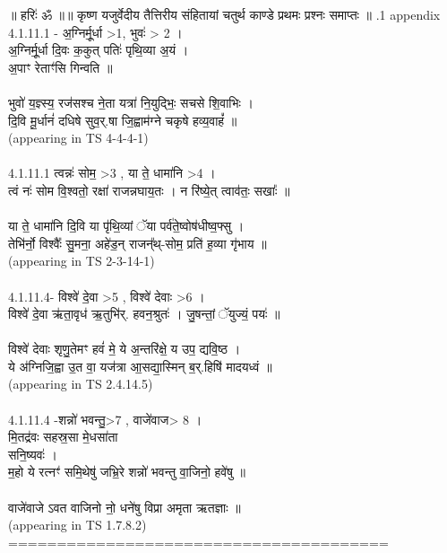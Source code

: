 \documentclass[17pt]{extarticle}
\begin{document}
        
        ॥ हरिः॑ ॐ ॥॥ कृष्ण यजुर्वेदीय तैत्तिरीय संहितायां चतुर्थ काण्डे प्रथमः प्रश्नः समाप्तः ॥ \newline
        .1   appendix\\4.1.11.1 - अ॒ग्निर्मू॒र्धा >1, भुवः॑ > 2 । \\अ॒ग्निर्मू॒र्धा दि॒वः क॒कुत् पतिः॑ पृथि॒व्या अ॒यं ।\\अ॒पाꣳ रेताꣳ॑सि गिन्वति ॥\\\\भुवो॑ य॒ज्ञ्स्य॒ रज॑सश्च ने॒ता यत्रा॑ नि॒युद्भिः॒ सचसे शि॒वाभिः ।\\दि॒वि मू॒र्धानं॑ दधिषे सुव॒र्.षा जि॒ह्वाम॑ग्ने चकृषे हव्य॒वाहं᳚ ॥\\(appearing in TS 4-4-4-1)\\\\4.1.11.1 त्वन्नः॑ सोम॒ >3 , या ते॒ धामा॑नि >4 । \\त्वं नः॑ सोम वि॒श्वतो॒ रक्षा॑ राजन्नघाय॒तः । न रि॑ष्ये॒त् त्वाव॑तः॒ सखाः᳚ ॥\\\\या ते॒ धामा॑नि दि॒वि या पृ॑थि॒व्यां ॅया पर्व॑ते॒ष्वोष॑धीष्व॒फ्सु । \\तेभि॑र्नो॒ विश्वैः᳚ सु॒मना॒ अहे॑ड॒न् राजन्᳚थ्-सोम॒ प्रति॑ ह॒व्या गृ॑भाय ॥\\(appearing in TS 2-3-14-1)\\\\4.1.11.4- विश्वे॑ दे॒वा >5 , विश्वे॑ देवाः >6 । \\विश्वे॑ दे॒वा ऋ॑ता॒वृध॑ ऋ॒तुभि॑र्. हवन॒श्रुतः॑ । जु॒षन्तां॒ ॅयुज्यं॒ पयः॑ ॥\\\\विश्वे॑ देवाः शृणु॒तेमꣳ हवं॑ मे॒ ये अ॒न्तरि॑क्षे॒ य उप॒ द्यवि॒ष्ठ । \\ये अ॑ग्निजि॒ह्वा उ॒त वा॒ यज॑त्रा आ॒सद्या॒स्मिन् ब॒र्.हिषि॑ मादयध्वं ॥ \\(appearing in TS 2.4.14.5)\\\\4.1.11.4 -शन्नो॑ भवन्तु॒>7 , वाजे॑वाज> 8 । \\मि॒तद्र॑वः सहस्र॒सा मे॒धसा॑ता \\सनि॒ष्यवः॑ । \\म॒हो ये रत्नꣳ॑ समि॒थेषु॑ जभ्रि॒रे शन्नो॑ भवन्तु वा॒जिनो॒ हवे॑षु ॥\\\\वाजे॑वाजे ऽवत वाजिनो नो॒ धने॑षु विप्रा अमृता ऋतज्ञाः ॥\\(appearing in TS 1.7.8.2)\\=======================================\\
                \pagebreak
        
\end{document}
